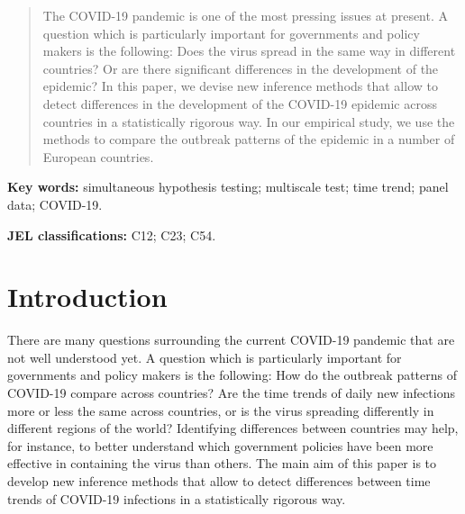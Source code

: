 \documentclass[a4paper,12pt]{article}
\numberwithin{equation}{section}
\begin{document}

\renewcommand{\thefootnote}{2}
\renewcommand{\thefootnote}{\arabic{footnote}}
\setcounter{footnote}{2}

\vspace{-0.85cm}

\renewcommand{\abstractname}{}
\begin{abstract}
\noindent The COVID-19 pandemic is one of the most pressing issues at present. A question which is particularly important for governments and policy makers is the following: Does the virus spread in the same way in different countries? Or are there significant differences in the development of the epidemic? In this paper, we devise new inference methods that allow to detect differences in the development of the COVID-19 epidemic across countries in a statistically rigorous way. In our empirical study, we use the methods to compare the outbreak patterns of the epidemic in a number of European countries.
\end{abstract}

\renewcommand{\baselinestretch}{1.2}\normalsize

\noindent \textbf{Key words:} simultaneous hypothesis testing; multiscale test; time trend; panel data; COVID-19.

\noindent \textbf{JEL classifications:} C12; C23; C54.




\section{Introduction}


There are many questions surrounding the current COVID-19 pandemic that are not well understood yet. A question which is particularly important for governments and policy makers is the following: How do the outbreak patterns of COVID-19 compare across countries? Are the time trends of daily new infections more or less the same across countries, or is the virus spreading differently in different regions of the world? Identifying differences between countries may help, for instance, to better understand which government policies have been more effective in containing the virus than others. The main aim of this paper is to develop new inference methods that allow to detect differences between time trends of COVID-19 infections in a statistically rigorous way.  
\end{document}
